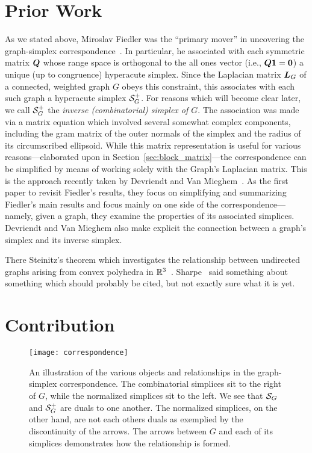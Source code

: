 \section{Prior Work}
\label{chap:intro_prior_work}

As we stated  above, Miroslav Fiedler was the ``primary  mover''  in  uncovering the graph-simplex correspondence~\cite{fiedler1993geometric,fiedler1998some,fiedler2011matrices}. In particular, he associated with each symmetric matrix $\vb*{Q}$ whose range space is orthogonal to the all ones vector (i.e.,  $\vb*{Q}\vb{1}=\vb{0}$) a unique (up to congruence) hyperacute simplex. Since the Laplacian  matrix  $\vb*{L}_G$ of a connected, weighted graph  $G$ obeys this constraint, this associates with  each such graph a hyperacute simplex  $\mathcal{S}_G^+$.   
For  reasons which will become clear later, we call $\mathcal{S}_G^+$ the \emph{inverse (combinatorial) simplex of $G$}. The  association  was  made via a matrix equation which involved several somewhat complex components, including  the gram matrix of the outer normals of the simplex and  the radius of its circumscribed ellipsoid. While this matrix representation is useful for various reasons---elaborated upon in  Section~\ref{sec:block_matrix}---the correspondence can  be simplified  by means of working solely  with the Graph's Laplacian  matrix. This is the approach  recently taken by Devriendt  and  Van  Mieghem~\cite{devriendt2018simplex}. As the first paper to  revisit Fiedler's results, they focus on simplifying and summarizing Fiedler's main  results and focus mainly on one  side of the correspondence---namely,  given  a graph,  they examine  the properties of  its associated  simplices. 
Devriendt and  Van Mieghem also make explicit the connection between a graph's simplex and  its  inverse  simplex. 

There 
Steinitz's theorem which investigates the relationship between undirected graphs arising from convex polyhedra in $\mathbb{R}^3$~\cite{steinitz1922polyeder}. 
Sharpe~\cite{sharpe1967theorem} said something about something which should probably be cited, but not exactly sure what it is yet. 


\section{Contribution}
\label{chap:intro_contribution}

\begin{figure}
	\centering 
	\texttt{[image: correspondence]}
	\caption{An illustration of the various objects and relationships in the graph-simplex correspondence. The combinatorial simplices sit to the right of $G$, while the normalized simplices sit to the left. We see that  $\mathcal{S}_G$ and $\mathcal{S}_G^+$ are duals to one another. The normalized simplices,  on the other hand, are not each others duals as exemplied by the discontinuity of the arrows. The arrows between $G$ and each of its simplices demonstrates how the relationship is formed.  }
\end{figure}


